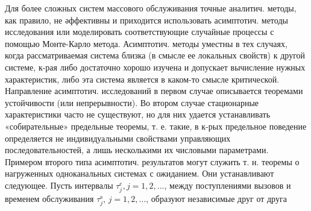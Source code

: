 \documentclass[10pt]{article}
\begin{document}
Для более сложных систем массового обслуживания точные аналитич. методы, как правило, не әффективны и приходится использовать асимптотич. методы исследования или моделировать соответствующие случайные процессы с помощью Монте-Карло метода. Асимптотич. методы уместны в тех случаях, когда рассматриваемая система близка (в смысле ее локальных свойств) к другой системе, к-рая либо достаточно хорошо изучена и допускает вычисление нужных характеристик, либо эта система является в каком-то смысле критической. Направление асимптотич. исследований в первом случае описывается теоремами устойчивости (или непрерывности). Во втором случае стационарные характеристики часто не существуют, но для них удается устанавливать «собирательные» предельные теоремы, т. е. такие, в к-рых предельное поведение определяется не индивидуальными свойствами управляющих последовательностей, а лишь несколькими их числовыми параметрами. Примером второго типа асимптотич. результатов могут служить т. н. теоремы о нагруженных одноканальных системах с ожиданием. Они устанавливают следующее. Пусть интервалы $\tau_{j}^{e}, j=1,2, \ldots$, между поступлениями вызовов и временем обслуживания $\tau_{j}^{\mathrm{s}}$, $j=1,2, \ldots$, образуют независимые друг от друга
\end{document}
